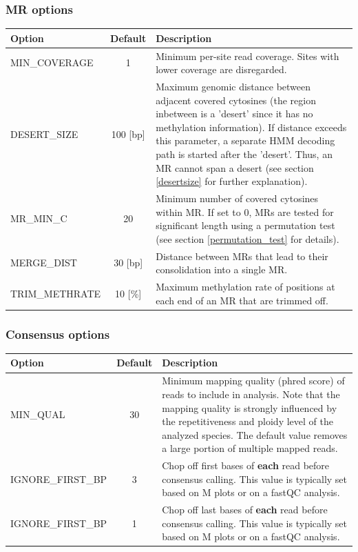 \documentclass{article}
\begin{document}
\subsubsection*{MR options}

\begin{longtable}[h]{lcp{9cm}}
	\toprule
	\bf Option & \bf Default & \bf Description\\ \midrule
	MIN\_COVERAGE & 1 & Minimum per-site read coverage. Sites with lower coverage are disregarded.\\
	DESERT\_SIZE & 100 [bp] & Maximum genomic distance between adjacent covered cytosines (the region inbetween is a 'desert' since it has no methylation information). If distance exceeds this parameter, a separate HMM decoding path is started after the 'desert'. Thus, an MR cannot span a desert (see section \ref{desertsize} for further explanation).\\
	MR\_MIN\_C & 20 & Minimum number of covered cytosines within MR. If set to 0, MRs are tested for significant length using a permutation test (see section \ref{permutation_test} for details).\\
	MERGE\_DIST & 30 [bp] & Distance between MRs that lead to their consolidation into a single MR.\\
	TRIM\_METHRATE & 10 [\%] & Maximum methylation rate of positions at each end of an MR that are trimmed off.\\
	\bottomrule
\end{longtable}


\subsubsection*{Consensus options}

\begin{longtable}[h]{lcp{9cm}}
	\toprule
	\bf Option & \bf Default & \bf Description\\ \midrule
	MIN\_QUAL & 30 & Minimum mapping quality (phred score) of reads to include in analysis. Note that the mapping quality is strongly influenced by the repetitiveness and ploidy level of the analyzed species. The default value removes a large portion of multiple mapped reads.\\
	IGNORE\_FIRST\_BP & 3 & Chop off first bases of \textbf{each} read before consensus calling. This value is typically set based on M plots or on a fastQC analysis.\\
	IGNORE\_FIRST\_BP & 1 & Chop off last bases of \textbf{each} read before consensus calling. This value is typically set based on M plots or on a fastQC analysis.\\
	\bottomrule
\end{longtable}
\end{document}
